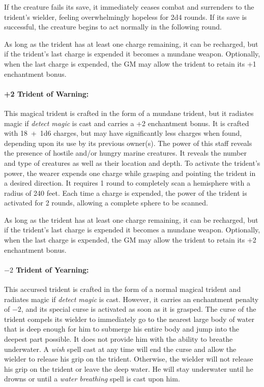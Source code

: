 \begin{multicols}{2}
If the creature fails its save, it immediately ceases combat and surrenders to the trident's wielder, feeling overwhelmingly hopeless for 2d4 rounds.  If its save is successful, the creature begins to act normally in the following round.

As long as the trident has at least one charge remaining, it can be recharged, but if the trident's last charge is expended it becomes a mundane weapon.  Optionally, when the last charge is expended, the GM may allow the trident to retain its +1 enchantment bonus.

\paragraph{+2 Trident of Warning:} This magical trident is crafted in the form of a mundane trident, but it radiates magic if \textit{detect magic} is cast and carries a +2 enchantment bonus.  It is crafted with 18~+~1d6 charges, but may have significantly less charges when found, depending upon its use by its previous owner(s).  The power of this staff reveals the presence of hostile and/or hungry marine creatures.  It reveals the number and type of creatures as well as their location and depth.  To activate the trident's power, the wearer expends one charge while grasping and pointing the trident in a desired direction.  It requires 1 round to completely scan a hemisphere with a radius of 240 feet.  Each time a charge is expended, the power of the trident is activated for 2 rounds, allowing a complete sphere to be scanned.

As long as the trident has at least one charge remaining, it can be recharged, but if the trident's last charge is expended it becomes a mundane weapon.  Optionally, when the last charge is expended, the GM may allow the trident to retain its +2 enchantment bonus.

\paragraph{$-2$ Trident of Yearning:} This accursed trident is crafted in the form of a normal magical trident and radiates magic if \textit{detect magic} is cast.  However, it carries an enchantment penalty of $-2$, and its special curse is activated as soon as it is grasped.  The curse of the trident compels its wielder to immediately go to the nearest large body of water that is deep enough for him to submerge his entire body and jump into the deepest part possible.  It does not provide him with the ability to breathe underwater.  A \textit{wish} spell cast at any time will end the curse and allow the wielder to release his grip on the trident.  Otherwise, the wielder will not release his grip on the trident or leave the deep water.  He will stay underwater until he drowns or until a \textit{water breathing} spell is cast upon him.


\end{multicols}
